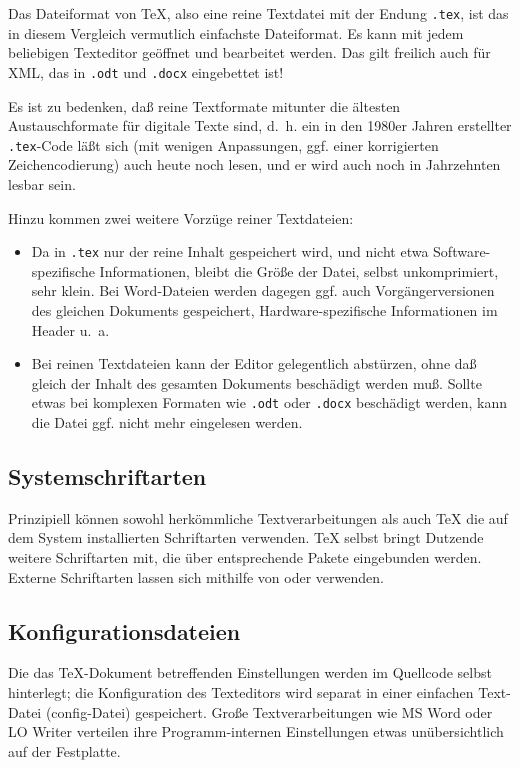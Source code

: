 \documentclass[11pt,a4paper,ngerman,DIV=8]{scrartcl}
\begin{document}
Das Dateiformat von \TeX{}, also eine reine Textdatei mit der Endung \texttt{.tex}, ist das in diesem Vergleich vermutlich einfachste Dateiformat. Es kann mit jedem beliebigen Texteditor geöffnet und bearbeitet werden. Das gilt freilich auch für XML, das in \texttt{.odt} und \texttt{.docx} eingebettet ist!

Es ist zu bedenken, daß reine Textformate mitunter die ältesten Austauschformate für digitale Texte sind, d.~h. ein in den 1980er Jahren erstellter \texttt{.tex}-Code läßt sich (mit wenigen Anpassungen, ggf. einer korrigierten Zeichencodierung) auch heute noch lesen, und er wird auch noch in Jahrzehnten lesbar sein.

Hinzu kommen zwei weitere Vorzüge reiner Textdateien:

\begin{itemize}
  \item Da in \texttt{.tex} nur der reine Inhalt gespeichert wird, und nicht etwa Software-spezifische Informationen, bleibt die Größe der Datei, selbst unkomprimiert, sehr klein. Bei Word-Dateien werden dagegen ggf. auch Vorgängerversionen des gleichen Dokuments gespeichert, Hardware-spezifische Informationen im Header u.~a.
  \item Bei reinen Textdateien kann der Editor gelegentlich abstürzen, ohne daß gleich der Inhalt des gesamten Dokuments beschädigt werden muß. Sollte etwas bei komplexen Formaten wie \texttt{.odt} oder \texttt{.docx} beschädigt werden, kann die Datei ggf. nicht mehr eingelesen werden.
\end{itemize}

\subsection{Systemschriftarten}

Prinzipiell können sowohl herkömmliche Textverarbeitungen als auch \TeX{} die auf dem System installierten Schriftarten verwenden. \TeX{} selbst bringt Dutzende weitere Schriftarten mit, die über entsprechende Pakete eingebunden werden. Externe Schriftarten lassen sich mithilfe von \XeTeX{} oder \LuaTeX{} verwenden.

\subsection{Konfigurationsdateien}

Die das \TeX{}-Dokument betreffenden Einstellungen werden im Quellcode selbst hinterlegt; die Konfiguration des Texteditors wird separat in einer einfachen Text-Datei (config-Datei) gespeichert. Große Textverarbeitungen wie MS Word oder LO Writer verteilen ihre Programm-internen Einstellungen etwas unübersichtlich auf der Festplatte.
\end{document}
